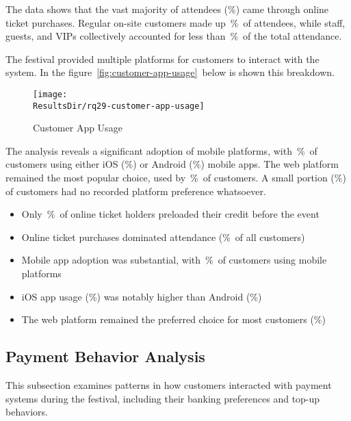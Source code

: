 The data shows that the vast majority of attendees (\%) came through online ticket purchases.
Regular on-site customers made up~\%~of attendees, while staff, guests, and VIPs collectively accounted for less than~\%~of the total attendance.


The festival provided multiple platforms for customers to interact with the system.
In the figure~\autoref{fig:customer-app-usage}~below is shown this breakdown.

\begin{figure}[H]
	\centering
	\texttt{[image: \\ResultsDir/rq29-customer-app-usage]}
	\caption{Customer App Usage}
	\label{fig:customer-app-usage}
	\source
\end{figure}

The analysis reveals a significant adoption of mobile platforms, with~\%~of customers using either iOS (\%) or Android (\%) mobile apps.
The web platform remained the most popular choice, used by~\%~of customers.
A small portion (\%) of customers had no recorded platform preference whatsoever.

\begin{keytakeaways}
	\begin{itemize}
		\item Only~\%~of online ticket holders preloaded their credit before the event
		\item Online ticket purchases dominated attendance (\%~of all customers)
		\item Mobile app adoption was substantial, with~\%~of customers using mobile platforms
		\item iOS app usage (\%) was notably higher than Android (\%)
		\item The web platform remained the preferred choice for most customers (\%)
	\end{itemize}
\end{keytakeaways}



\subsection{Payment Behavior Analysis}
\label{subsec:analysis-customer-payment-behavior}
This subsection examines patterns in how customers interacted with payment systems during the festival, including their banking preferences and top-up behaviors.

